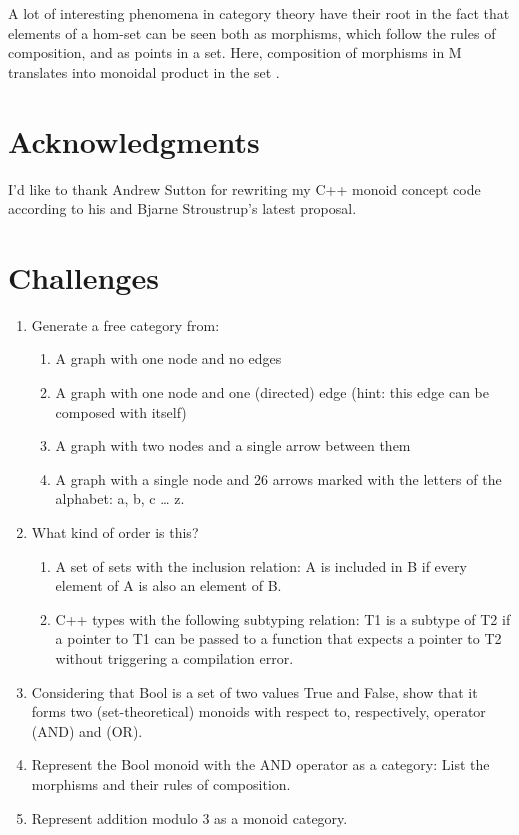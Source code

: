 A lot of interesting phenomena in category theory have their root in the
fact that elements of a hom-set can be seen both as morphisms, which
follow the rules of composition, and as points in a set. Here,
composition of morphisms in M translates into monoidal product in the
set .

\section{Acknowledgments}\label{acknowledgments}

I'd like to thank Andrew Sutton for rewriting my C++ monoid concept code
according to his and Bjarne Stroustrup's latest proposal.

\section{Challenges}\label{challenges}

\begin{enumerate}
\item
  Generate a free category from:

  \begin{enumerate}
  \tightlist
  \item
    A graph with one node and no edges
  \item
    A graph with one node and one (directed) edge (hint: this edge can
    be composed with itself)
  \item
    A graph with two nodes and a single arrow between them
  \item
    A graph with a single node and 26 arrows marked with the letters of
    the alphabet: a, b, c \ldots{} z.
  \end{enumerate}
\item
  What kind of order is this?

  \begin{enumerate}
  \tightlist
  \item
    A set of sets with the inclusion relation: A is included in B if
    every element of A is also an element of B.
  \item
    C++ types with the following subtyping relation: T1 is a subtype of
    T2 if a pointer to T1 can be passed to a function that expects a
    pointer to T2 without triggering a compilation error.
  \end{enumerate}
\item
  Considering that Bool is a set of two values True and False, show that
  it forms two (set-theoretical) monoids with respect to, respectively,
  operator \code{\&\&} (AND) and \code{\textbar{}\textbar{}} (OR).
\item
  Represent the Bool monoid with the AND operator as a category: List
  the morphisms and their rules of composition.
\item
  Represent addition modulo 3 as a monoid category.
\end{enumerate}